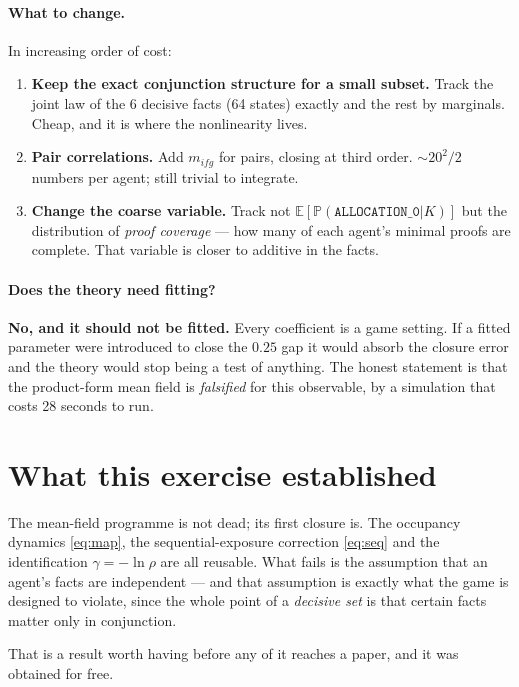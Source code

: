 \documentclass[11pt,a4paper]{article}
\newcommand{\Prob}{\mathbb{P}}\newcommand{\Ex}{\mathbb{E}}
\newcommand{\A}[1]{\texttt{ALLOCATION\_#1}}
\begin{document}
\paragraph{What to change.} In increasing order of cost:
\begin{enumerate}
\item \textbf{Keep the exact conjunction structure for a small subset.} Track the
joint law of the 6 decisive facts (64 states) exactly and the rest by marginals.
Cheap, and it is where the nonlinearity lives.
\item \textbf{Pair correlations.} Add $m_{ifg}$ for pairs, closing at third
order. $\sim\!20^2/2$ numbers per agent; still trivial to integrate.
\item \textbf{Change the coarse variable.} Track not $\Ex[\Prob(\A{0}|K)]$ but
the distribution of \emph{proof coverage} --- how many of each agent's minimal
proofs are complete. That variable is closer to additive in the facts.
\end{enumerate}

\paragraph{Does the theory need fitting?} \textbf{No, and it should not be
fitted.} Every coefficient is a game setting. If a fitted parameter were
introduced to close the $0.25$ gap it would absorb the closure error and the
theory would stop being a test of anything. The honest statement is that the
product-form mean field is \emph{falsified} for this observable, by a
simulation that costs 28 seconds to run.

\section{What this exercise established}

The mean-field programme is not dead; its first closure is. The occupancy
dynamics \eqref{eq:map}, the sequential-exposure correction \eqref{eq:seq} and
the identification $\gamma=-\ln\rho$ are all reusable. What fails is the
assumption that an agent's facts are independent --- and that assumption is
exactly what the game is designed to violate, since the whole point of a
\emph{decisive set} is that certain facts matter only in conjunction.

That is a result worth having before any of it reaches a paper, and it was
obtained for free.
\end{document}
